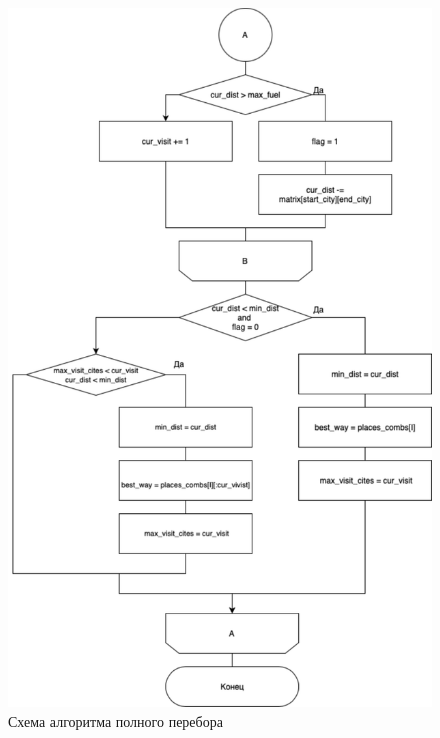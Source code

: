 \begin{figure}[h]
    \centering
    \includegraphics[width=0.80\linewidth]{img/full_comb2.pdf}
    \caption{Схема алгоритма полного перебора}
    \label{img:brute2}
\end{figure}
\noindent

